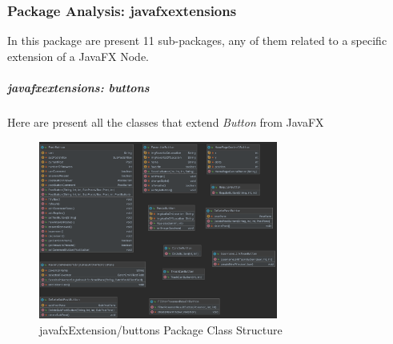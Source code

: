 \subsubsection{Package Analysis: javafxextensions}
In this package are present 11 sub-packages, any of them related to a specific extension of a JavaFX Node.
\subparagraph{javafxextensions: buttons}
Here are present all the classes that extend \textit{Button} from JavaFX
\begin{figure}[H]
	\centering
	\includegraphics[width=0.7\textwidth]{img/javafx_buttons_package.png}
	\caption{javafxExtension/buttons Package Class Structure}
\end{figure}
\begingroup
\setlength{\tabcolsep}{10pt} %
\renewcommand{\arraystretch}{1.5} %
